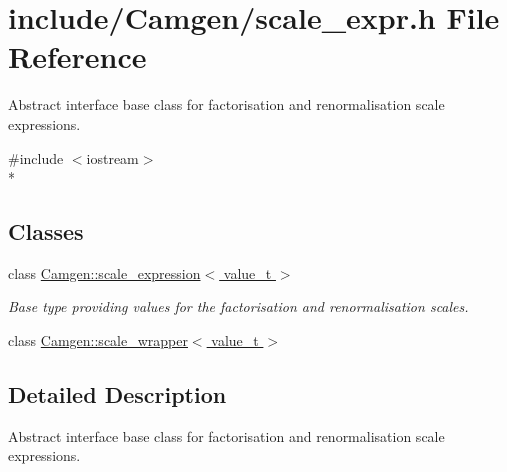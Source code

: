 \hypertarget{a00741}{\section{include/\-Camgen/scale\-\_\-expr.h File Reference}
\label{a00741}
}


Abstract interface base class for factorisation and renormalisation scale expressions.  


{\ttfamily \#include $<$iostream$>$}\\*
\subsection*{Classes}
\begin{DoxyCompactItemize}
\item 
class \hyperlink{a00489}{Camgen\-::scale\-\_\-expression$<$ value\-\_\-t $>$}
\begin{DoxyCompactList}\small\item\em Base type providing values for the factorisation and renormalisation scales. \end{DoxyCompactList}\item 
class \hyperlink{a00490}{Camgen\-::scale\-\_\-wrapper$<$ value\-\_\-t $>$}
\end{DoxyCompactItemize}


\subsection{Detailed Description}
Abstract interface base class for factorisation and renormalisation scale expressions. 